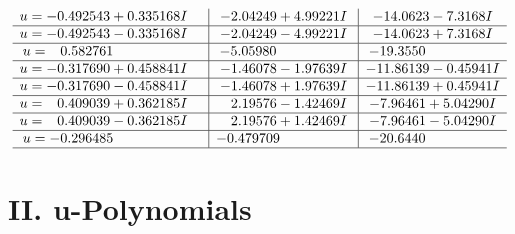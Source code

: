 \documentclass[1p]{elsarticle_modified}
\theoremstyle{definition}
\begin{document}
$$\begin{array}{c|c|c}
\begin{aligned}
u &= -0.492543 + 0.335168 I\end{aligned}
 & -2.04249 + 4.99221 I & -14.0623 - 7.3168 I \\ \hline\begin{aligned}
u &= -0.492543 - 0.335168 I\end{aligned}
 & -2.04249 - 4.99221 I & -14.0623 + 7.3168 I \\ \hline\begin{aligned}
u &= \phantom{-}0.582761\phantom{ +0.000000I}\end{aligned}
 & -5.05980\phantom{ +0.000000I} & -19.3550\phantom{ +0.000000I} \\ \hline\begin{aligned}
u &= -0.317690 + 0.458841 I\end{aligned}
 & -1.46078 - 1.97639 I & -11.86139 - 0.45941 I \\ \hline\begin{aligned}
u &= -0.317690 - 0.458841 I\end{aligned}
 & -1.46078 + 1.97639 I & -11.86139 + 0.45941 I \\ \hline\begin{aligned}
u &= \phantom{-}0.409039 + 0.362185 I\end{aligned}
 & \phantom{-}2.19576 - 1.42469 I & -7.96461 + 5.04290 I \\ \hline\begin{aligned}
u &= \phantom{-}0.409039 - 0.362185 I\end{aligned}
 & \phantom{-}2.19576 + 1.42469 I & -7.96461 - 5.04290 I \\ \hline\begin{aligned}
u &= -0.296485\phantom{ +0.000000I}\end{aligned}
 & -0.479709\phantom{ +0.000000I} & -20.6440\phantom{ +0.000000I}\\
 \hline 
 \end{array}$$\newpage
\newpage\renewcommand{\arraystretch}{1}
\centering \section*{ II. u-Polynomials}
\end{document}
